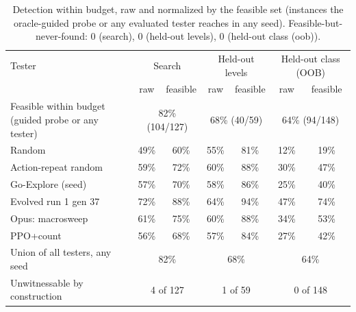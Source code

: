 \begin{table}[t]\centering\small
\begin{tabular}{lcccccc}
\toprule
Tester & \multicolumn{2}{c}{Search} & \multicolumn{2}{c}{Held-out levels} & \multicolumn{2}{c}{Held-out class (OOB)} \\
 & raw & feasible & raw & feasible & raw & feasible \\
\midrule
Feasible within budget (guided probe or any tester) & \multicolumn{2}{c}{82\% (104/127)} & \multicolumn{2}{c}{68\% (40/59)} & \multicolumn{2}{c}{64\% (94/148)} \\
\midrule
Random & 49\% & 60\% & 55\% & 81\% & 12\% & 19\% \\
Action-repeat random & 59\% & 72\% & 60\% & 88\% & 30\% & 47\% \\
Go-Explore (seed) & 57\% & 70\% & 58\% & 86\% & 25\% & 40\% \\
Evolved run 1 gen 37 & 72\% & 88\% & 64\% & 94\% & 47\% & 74\% \\
Opus: macrosweep & 61\% & 75\% & 60\% & 88\% & 34\% & 53\% \\
PPO+count & 56\% & 68\% & 57\% & 84\% & 27\% & 42\% \\
\midrule
Union of all testers, any seed & \multicolumn{2}{c}{82\%} & \multicolumn{2}{c}{68\%} & \multicolumn{2}{c}{64\%} \\
Unwitnessable by construction & \multicolumn{2}{c}{4 of 127} & \multicolumn{2}{c}{1 of 59} & \multicolumn{2}{c}{0 of 148} \\
\bottomrule
\end{tabular}
\caption{Detection within budget, raw and normalized by the feasible set (instances the oracle-guided probe or any evaluated tester reaches in any seed). Feasible-but-never-found: 0 (search), 0 (held-out levels), 0 (held-out class (oob)).}
\label{tab:feasibility}
\end{table}
